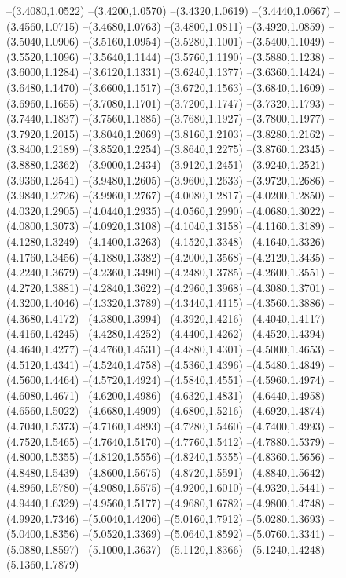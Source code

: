 {\begin{scope}
--(3.4080,1.0522)
--(3.4200,1.0570)
--(3.4320,1.0619)
--(3.4440,1.0667)
--(3.4560,1.0715)
--(3.4680,1.0763)
--(3.4800,1.0811)
--(3.4920,1.0859)
--(3.5040,1.0906)
--(3.5160,1.0954)
--(3.5280,1.1001)
--(3.5400,1.1049)
--(3.5520,1.1096)
--(3.5640,1.1144)
--(3.5760,1.1190)
--(3.5880,1.1238)
--(3.6000,1.1284)
--(3.6120,1.1331)
--(3.6240,1.1377)
--(3.6360,1.1424)
--(3.6480,1.1470)
--(3.6600,1.1517)
--(3.6720,1.1563)
--(3.6840,1.1609)
--(3.6960,1.1655)
--(3.7080,1.1701)
--(3.7200,1.1747)
--(3.7320,1.1793)
--(3.7440,1.1837)
--(3.7560,1.1885)
--(3.7680,1.1927)
--(3.7800,1.1977)
--(3.7920,1.2015)
--(3.8040,1.2069)
--(3.8160,1.2103)
--(3.8280,1.2162)
--(3.8400,1.2189)
--(3.8520,1.2254)
--(3.8640,1.2275)
--(3.8760,1.2345)
--(3.8880,1.2362)
--(3.9000,1.2434)
--(3.9120,1.2451)
--(3.9240,1.2521)
--(3.9360,1.2541)
--(3.9480,1.2605)
--(3.9600,1.2633)
--(3.9720,1.2686)
--(3.9840,1.2726)
--(3.9960,1.2767)
--(4.0080,1.2817)
--(4.0200,1.2850)
--(4.0320,1.2905)
--(4.0440,1.2935)
--(4.0560,1.2990)
--(4.0680,1.3022)
--(4.0800,1.3073)
--(4.0920,1.3108)
--(4.1040,1.3158)
--(4.1160,1.3189)
--(4.1280,1.3249)
--(4.1400,1.3263)
--(4.1520,1.3348)
--(4.1640,1.3326)
--(4.1760,1.3456)
--(4.1880,1.3382)
--(4.2000,1.3568)
--(4.2120,1.3435)
--(4.2240,1.3679)
--(4.2360,1.3490)
--(4.2480,1.3785)
--(4.2600,1.3551)
--(4.2720,1.3881)
--(4.2840,1.3622)
--(4.2960,1.3968)
--(4.3080,1.3701)
--(4.3200,1.4046)
--(4.3320,1.3789)
--(4.3440,1.4115)
--(4.3560,1.3886)
--(4.3680,1.4172)
--(4.3800,1.3994)
--(4.3920,1.4216)
--(4.4040,1.4117)
--(4.4160,1.4245)
--(4.4280,1.4252)
--(4.4400,1.4262)
--(4.4520,1.4394)
--(4.4640,1.4277)
--(4.4760,1.4531)
--(4.4880,1.4301)
--(4.5000,1.4653)
--(4.5120,1.4341)
--(4.5240,1.4758)
--(4.5360,1.4396)
--(4.5480,1.4849)
--(4.5600,1.4464)
--(4.5720,1.4924)
--(4.5840,1.4551)
--(4.5960,1.4974)
--(4.6080,1.4671)
--(4.6200,1.4986)
--(4.6320,1.4831)
--(4.6440,1.4958)
--(4.6560,1.5022)
--(4.6680,1.4909)
--(4.6800,1.5216)
--(4.6920,1.4874)
--(4.7040,1.5373)
--(4.7160,1.4893)
--(4.7280,1.5460)
--(4.7400,1.4993)
--(4.7520,1.5465)
--(4.7640,1.5170)
--(4.7760,1.5412)
--(4.7880,1.5379)
--(4.8000,1.5355)
--(4.8120,1.5556)
--(4.8240,1.5355)
--(4.8360,1.5656)
--(4.8480,1.5439)
--(4.8600,1.5675)
--(4.8720,1.5591)
--(4.8840,1.5642)
--(4.8960,1.5780)
--(4.9080,1.5575)
--(4.9200,1.6010)
--(4.9320,1.5441)
--(4.9440,1.6329)
--(4.9560,1.5177)
--(4.9680,1.6782)
--(4.9800,1.4748)
--(4.9920,1.7346)
--(5.0040,1.4206)
--(5.0160,1.7912)
--(5.0280,1.3693)
--(5.0400,1.8356)
--(5.0520,1.3369)
--(5.0640,1.8592)
--(5.0760,1.3341)
--(5.0880,1.8597)
--(5.1000,1.3637)
--(5.1120,1.8366)
--(5.1240,1.4248)
--(5.1360,1.7879)

\end{scope}}
